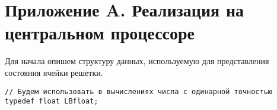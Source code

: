 \section*{Приложение A. Реализация на центральном процессоре}
\label{apx:impl_cpu}

Для начала опишем структуру данных, используемую для представления состояния ячейки решетки.
\begin{lstlisting}[caption={Структура данных для представления ячейки}]
// Будем использовать в вычислениях числа с одинарной точностью
typedef float LBfloat;

\end{lstlisting}
